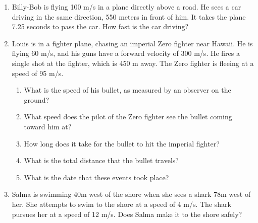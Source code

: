 \documentclass[letterpaper, 12pt]{article}
\begin{document}
\begin{enumerate}
\vspace{1.5in}




\item Billy-Bob is flying 100 m/s in a plane directly above a road.  He sees a car driving in the same direction, 550 meters in front of him.  It takes the plane 7.25 seconds to pass the car.  How fast is the car driving?
\vspace{.75in}
\item Louis is in a fighter plane, chasing an imperial Zero fighter near Hawaii.  He is flying 60 m/s, and his guns have a forward velocity of 300 m/s.  He fires a single shot at the fighter, which is 450 m away.  The Zero fighter is fleeing at a speed of 95 m/s.
\begin{enumerate}
	\item What is the speed of his bullet, as measured by an observer on the ground?
	\vspace{.75in}
	\item What speed does the pilot of the Zero fighter see the bullet coming toward him at?
	\vspace{.75in}
	\item How long does it take for the bullet to hit the imperial fighter?
	\vspace{.75in}
	\item What is the total distance that the bullet travels?
	\vspace{.75in}
	\item What is the date that these events took place?
\end{enumerate}

\vspace{.75in}
\item Salma is swimming 40m west of the shore when she sees a shark 78m west of her.  She attempts to swim to the shore at a speed of 4 m/s.  The shark pursues her at a speed of 12 m/s.  Does Salma make it to the shore safely? 







	
\end{enumerate}
 
\end{document}
